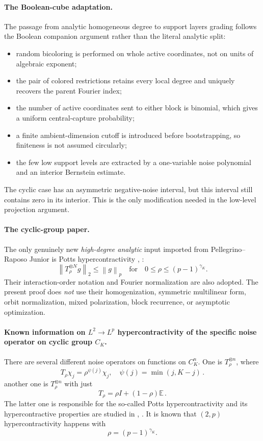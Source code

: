 \documentclass[11pt]{article}
\theoremstyle{definition}
\theoremstyle{remark}
\newcommand{\norm}[1]{\left\lVert #1\right\rVert}
\begin{document}
\paragraph{The Boolean-cube adaptation.}
The passage from analytic homogeneous degree to support layers grading follows the
Boolean companion argument rather than the literal analytic split:
\begin{itemize}
\item random bicoloring is performed on whole active coordinates, not on units
of algebraic exponent;
\item the pair of colored restrictions retains every local degree and
uniquely recovers the parent Fourier index;
\item the number of active coordinates sent to either block is binomial, which
gives a uniform central-capture probability;
\item a finite ambient-dimension cutoff is introduced before bootstrapping, so
finiteness is not assumed circularly;
\item the few low support levels are extracted by a one-variable noise
polynomial and an interior Bernstein estimate.
\end{itemize}
The cyclic case has an asymmetric negative-noise interval, but this interval
still contains zero in its interior.  This is the only modification needed in
the low-level projection argument.

\paragraph{The cyclic-group paper.}
The only genuinely new \emph{high-degree analytic} input imported from
Pellegrino--Raposo Junior \cite{PellegrinoRaposo} is Potts hypercontractivity \cite{DiaconisSaloffCoste}, \cite{Gross}:
\[
 \norm{T_\rho^{\otimes N}g}_2\le\norm g_p
 \quad\text{for}\quad
 0\le\rho\le(p-1)^{\gamma_K}.
\]
Their interaction-order notation and Fourier normalization are also adopted.
The present proof does \emph{not} use their homogenization, symmetric
multilinear form, orbit normalization, mixed polarization, block recurrence,
or asymptotic optimization.

\paragraph{Known information on $L^2\to L^p$ hypercontractivity of the specific noise operator on cyclic group $C_K$.}
There are several different noise operators on functions on $C_K^n$. 
One is $T_\rho^{\otimes n}$, where
$$
T_\rho \chi_j = \rho^{\psi(j)} \chi_j, \quad \psi(j) =\min (j, K-j)\,.
$$
another one is $T_\rho^{\otimes n}$ with just
$$
T_\rho =\rho I +(1-\rho) \mathbb E\,.
$$
The latter one is responsible for the so-called Potts hypercontractivity and its hypercontractive properties are studied in \cite{DiaconisSaloffCoste}, \cite{Gross}.
It is known that $(2,p)$ hypercontractivity happens with 
$$
\rho=(p-1)^{\gamma_K}.
$$
\end{document}
